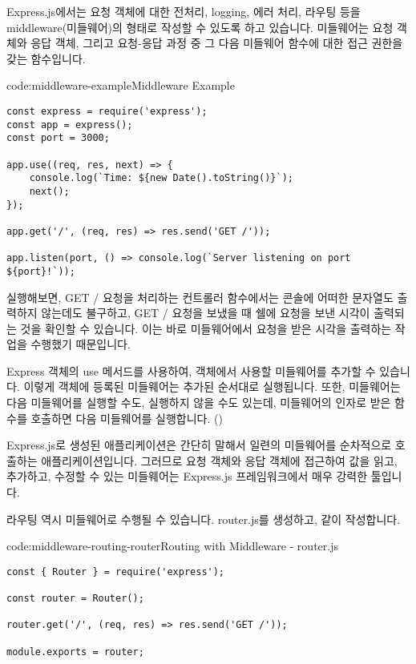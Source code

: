 Express.js에서는 요청 객체에 대한 전처리, logging, 에러 처리, 라우팅 등을 middleware(미들웨어)의 형태로 작성할 수 있도록 하고 있습니다. 미들웨어는 요청 객체와 응답 객체, 그리고 요청-응답 과정 중 그 다음 미들웨어 함수에 대한 접근 권한을 갖는 함수입니다.

\begin{codeenv}{code:middleware-example}{Middleware Example}\begin{verbatim}
const express = require('express');
const app = express();
const port = 3000;

app.use((req, res, next) => {
    console.log(`Time: ${new Date().toString()}`);
    next();
});

app.get('/', (req, res) => res.send('GET /'));

app.listen(port, () => console.log(`Server listening on port ${port}!`));
\end{verbatim}
\end{codeenv}

\을 실행해보면, GET / 요청을 처리하는 컨트롤러 함수에서는 콘솔에 어떠한 문자열도 출력하지 않는데도 불구하고, GET / 요청을 보냈을 때 쉘에 요청을 보낸 시각이 출력되는 것을 확인할 수 있습니다. 이는 바로 미들웨어에서 요청을 받은 시각을 출력하는 작업을 수행했기 때문입니다.

Express 객체의 use 메서드를 사용하여,  객체에서 사용할 미들웨어를 추가할 수 있습니다. 이렇게  객체에 등록된 미들웨어는 추가된 순서대로 실행됩니다. 또한, 미들웨어는 다음 미들웨어를 실행할 수도, 실행하지 않을 수도 있는데, 미들웨어의 인자로 받은  함수를 호출하면 다음 미들웨어를 실행합니다. ()


Express.js로 생성된 애플리케이션은 간단히 말해서 일련의 미들웨어를 순차적으로 호출하는 애플리케이션입니다. 그러므로 요청 객체와 응답 객체에 접근하여 값을 읽고, 추가하고, 수정할 수 있는 미들웨어는 Express.js 프레임워크에서 매우 강력한 툴입니다.

라우팅 역시 미들웨어로 수행될 수 있습니다. router.js를 생성하고, \와 같이 작성합니다.

\begin{codeenv}{code:middleware-routing-router}{Routing with Middleware - router.js}\begin{verbatim}
const { Router } = require('express');

const router = Router();

router.get('/', (req, res) => res.send('GET /'));

module.exports = router;
\end{verbatim}
\end{codeenv}

